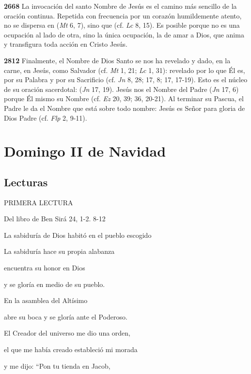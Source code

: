 \begin{body}
\begin{body}
\textbf{2668} La invocación del santo Nombre de Jesús es el camino más sencillo de la oración continua. Repetida con frecuencia por un corazón humildemente atento, no se dispersa en  (\emph{Mt} 6, 7), sino que  (cf. \emph{Lc} 8, 15). Es posible  porque no es una ocupación al lado de otra, sino la única ocupación, la de amar a Dios, que anima y transfigura toda acción en Cristo Jesús.

\textbf{2812} Finalmente, el Nombre de Dios Santo se nos ha revelado y dado, en la carne, en Jesús, como Salvador (cf. \emph{Mt} 1, 21; \emph{Lc} 1, 31): revelado por lo que Él es, por su Palabra y por su Sacrificio (cf. \emph{Jn} 8, 28; 17, 8; 17, 17-19). Esto es el núcleo de su oración sacerdotal:  (\emph{Jn} 17, 19). Jesús nos  el Nombre del Padre (\emph{Jn} 17, 6) porque  Él mismo su Nombre (cf. \emph{Ez} 20, 39; 36, 20-21). Al terminar su Pascua, el Padre le da el Nombre que está sobre todo nombre: Jesús es Señor para gloria de Dios Padre (cf. \emph{Flp} 2, 9-11).

\chapter{Domingo II de Navidad}

\section{Lecturas}

PRIMERA LECTURA

Del libro de Ben Sirá 24, 1-2. 8-12

La sabiduría de Dios habitó en el pueblo escogido

La sabiduría hace su propia alabanza

encuentra su honor en Dios

y se gloría en medio de su pueblo.

En la asamblea del Altísimo

abre su boca y se gloría ante el Poderoso.

El Creador del universo me dio una orden,

el que me había creado estableció mi morada

y me dijo: ``Pon tu tienda en Jacob,


\end{body}
\end{body}

